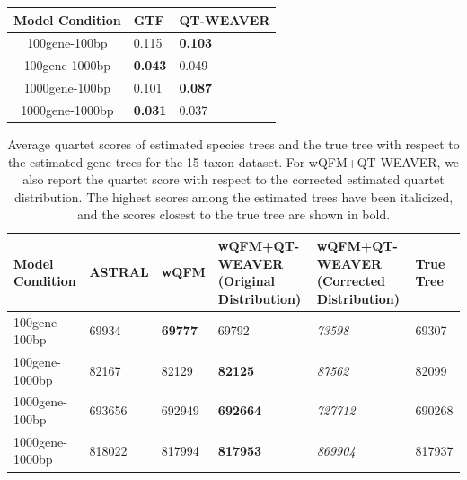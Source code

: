 \documentclass[runningheads]{llncs}
\begin{document}
\begin{appendices}
\begin{table}[h!]
    \begin{tabular}{|c|C{3cm}|C{3cm}|}
        \hline
        \textbf{Model Condition} & \textbf{GTF} & \textbf{QT-WEAVER} \\
        \hline
        100gene-100bp & 0.115 & \textbf{0.103} \\
        \hline
        100gene-1000bp & \textbf{0.043} & 0.049 \\
        \hline
        1000gene-100bp & 0.101 & \textbf{0.087} \\
        \hline
        1000gene-1000bp & \textbf{0.031} & 0.037 \\
        \hline
    \end{tabular}
\end{table}

\begin{table}[h!]
    \centering
    \caption{Average quartet scores of estimated species trees and the true tree with respect to the estimated gene trees for the 15-taxon dataset. For wQFM+QT-WEAVER, we also report the quartet score with respect to the corrected estimated quartet distribution. The highest scores among the estimated trees have been italicized, and the scores closest to the true tree are shown in bold.}
    \label{tab:15-quartet-scores-estimated}
    \begin{tabular}{|C{2cm}|C{2.5cm}|C{2.5cm}|C{2.5cm}|C{2.5cm}|C{2.5cm}|}
        \hline
        \textbf{Model Condition} & \textbf{ASTRAL} & \textbf{wQFM} & \textbf{wQFM+QT-WEAVER (Original Distribution)} & \textbf{wQFM+QT-WEAVER (Corrected Distribution)} & \textbf{True Tree} \\
        \hline \hline
        100gene-100bp & 69934 & \textbf{69777} & 69792 & \textit{73598} & 69307 \\
        \hline
        100gene-1000bp & 82167 & 82129 & \textbf{82125} & \textit{87562} & 82099 \\
        \hline
        1000gene-100bp & 693656 & 692949 & \textbf{692664} & \textit{727712} & 690268 \\
        \hline
        1000gene-1000bp & 818022 & 817994 & \textbf{817953} & \textit{869904} & 817937 \\
        \hline
    \end{tabular}
\end{table}


\end{appendices}
\end{document}
